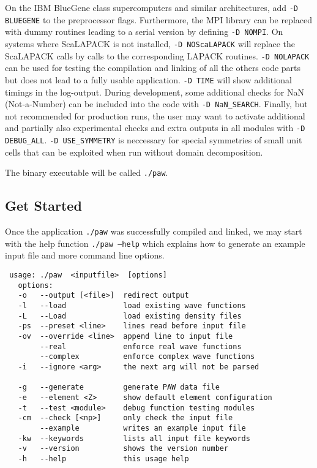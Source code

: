 \documentclass[12pt,BCOR8mm,noappendixprefix,nochapterprefix,bibtotoc,idxtotoc,openbib,tablecaptionabove]{scrbook}
\newcommand{\ttt}[1]{\texttt{#1}}
\begin{document}
On the IBM BlueGene class supercomputers and similar architectures, 
add \ttt{-D BLUEGENE} to the preprocessor flags. Furthermore, the MPI library can 
be replaced with dummy routines leading to a serial version by defining \ttt{-D NOMPI}. 
On systems where ScaLAPACK is not installed, \ttt{-D NOScaLAPACK} will replace 
the ScaLAPACK calls by calls to the corresponding LAPACK routines. \ttt{-D NOLAPACK} 
can be used for testing the compilation and linking of all the others code parts but 
does not lead to a fully usable application. \ttt{-D TIME} will show additional 
timings in the log-output. During development, some additional checks for NaN (Not-a-Number) 
can be included into the code with \ttt{-D NaN\_SEARCH}. Finally, but not 
recommended for production runs, the user may want to activate additional and partially 
also experimental checks and extra outputs in all modules with \ttt{-D DEBUG\_ALL}. 
\ttt{-D USE\_SYMMETRY} is neccessary for special symmetries of small unit cells 
that can be exploited when run without domain decomposition.

The binary executable will be called \ttt{./paw}.

\subsection{Get Started} \label{sec:MAN_get_started}

Once the application \ttt{./paw} was successfully compiled and linked, we may 
start with the help function \ttt{./paw --help} which explains how to generate 
an example input file and more command line options.
\begin{verbatim}
 usage: ./paw  <inputfile>  [options]
   options:
   -o   --output [<file>]  redirect output
   -l   --load             load existing wave functions
   -L   --Load             load existing density files
   -ps  --preset <line>    lines read before input file
   -ov  --override <line>  append line to input file
        --real             enforce real wave functions
        --complex          enforce complex wave functions
   -i   --ignore <arg>     the next arg will not be parsed

   -g   --generate         generate PAW data file
   -e   --element <Z>      show default element configuration
   -t   --test <module>    debug function testing modules
   -cm  --check [<np>]     only check the input file
        --example          writes an example input file
   -kw  --keywords         lists all input file keywords
   -v   --version          shows the version number
   -h   --help             this usage help
\end{verbatim}
\end{document}

